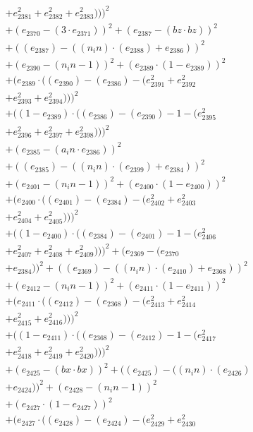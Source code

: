 \documentclass[10pt, a4paper]{article}
\begin{document}
\begin{small}
\begin{align*}
& + e_{2381}^{2} + e_{2382}^{2} + e_{2383}^{2})))^{2} \\
& + (e_{2370} - (3  \cdot  e_{2371}))^{2} + (e_{2387} - (bz  \cdot  bz))^{2} \\
& + ((e_{2387}) - ((n_in)  \cdot  (e_{2388}) + e_{2386}))^{2} \\
& + (e_{2390} - (n_in - 1))^{2} + (e_{2389}  \cdot  (1 - e_{2389}))^{2} \\
& + (e_{2389}  \cdot  ((e_{2390}) - (e_{2386}) - (e_{2391}^{2} + e_{2392}^{2} \\
& + e_{2393}^{2} + e_{2394}^{2})))^{2} \\
& + ((1 - e_{2389})  \cdot  ((e_{2386}) - (e_{2390}) - 1 - (e_{2395}^{2} \\
& + e_{2396}^{2} + e_{2397}^{2} + e_{2398}^{2})))^{2} \\
& + (e_{2385} - (a_in  \cdot  e_{2386}))^{2} \\
& + ((e_{2385}) - ((n_in)  \cdot  (e_{2399}) + e_{2384}))^{2} \\
& + (e_{2401} - (n_in - 1))^{2} + (e_{2400}  \cdot  (1 - e_{2400}))^{2} \\
& + (e_{2400}  \cdot  ((e_{2401}) - (e_{2384}) - (e_{2402}^{2} + e_{2403}^{2} \\
& + e_{2404}^{2} + e_{2405}^{2})))^{2} \\
& + ((1 - e_{2400})  \cdot  ((e_{2384}) - (e_{2401}) - 1 - (e_{2406}^{2} \\
& + e_{2407}^{2} + e_{2408}^{2} + e_{2409}^{2})))^{2} + (e_{2369} - (e_{2370} \\
& + e_{2384}))^{2} + ((e_{2369}) - ((n_in)  \cdot  (e_{2410}) + e_{2368}))^{2} \\
& + (e_{2412} - (n_in - 1))^{2} + (e_{2411}  \cdot  (1 - e_{2411}))^{2} \\
& + (e_{2411}  \cdot  ((e_{2412}) - (e_{2368}) - (e_{2413}^{2} + e_{2414}^{2} \\
& + e_{2415}^{2} + e_{2416}^{2})))^{2} \\
& + ((1 - e_{2411})  \cdot  ((e_{2368}) - (e_{2412}) - 1 - (e_{2417}^{2} \\
& + e_{2418}^{2} + e_{2419}^{2} + e_{2420}^{2})))^{2} \\
& + (e_{2425} - (bx  \cdot  bx))^{2} + ((e_{2425}) - ((n_in)  \cdot  (e_{2426}) \\
& + e_{2424}))^{2} + (e_{2428} - (n_in - 1))^{2} \\
& + (e_{2427}  \cdot  (1 - e_{2427}))^{2} \\
& + (e_{2427}  \cdot  ((e_{2428}) - (e_{2424}) - (e_{2429}^{2} + e_{2430}^{2} \\

\end{align*}
\end{small}
\end{document}
